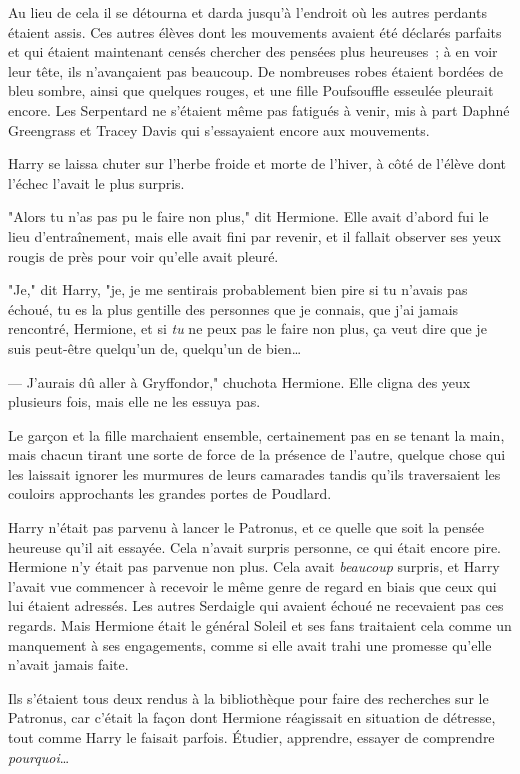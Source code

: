 Au lieu de cela il se détourna et darda jusqu'à l'endroit où les autres perdants étaient assis. Ces autres élèves dont les mouvements avaient été déclarés parfaits et qui étaient maintenant censés chercher des pensées plus heureuses~; à en voir leur tête, ils n'avançaient pas beaucoup. De nombreuses robes étaient bordées de bleu sombre, ainsi que quelques rouges, et une fille Poufsouffle esseulée pleurait encore. Les Serpentard ne s'étaient même pas fatigués à venir, mis à part Daphné Greengrass et Tracey Davis qui s'essayaient encore aux mouvements.

Harry se laissa chuter sur l'herbe froide et morte de l'hiver, à côté de l'élève dont l'échec l'avait le plus surpris.

"Alors tu n'as pas pu le faire non plus," dit Hermione. Elle avait d'abord fui le lieu d'entraînement, mais elle avait fini par revenir, et il fallait observer ses yeux rougis de près pour voir qu'elle avait pleuré.

"Je," dit Harry, "je, je me sentirais probablement bien pire si tu n'avais pas échoué, tu es la plus gentille des personnes que je connais, que j'ai jamais rencontré, Hermione, et si \emph{tu} ne peux pas le faire non plus, ça veut dire que je suis peut-être quelqu'un de, quelqu'un de bien…

--- J'aurais dû aller à Gryffondor," chuchota Hermione. Elle cligna des yeux plusieurs fois, mais elle ne les essuya pas.

\later

Le garçon et la fille marchaient ensemble, certainement pas en se tenant la main, mais chacun tirant une sorte de force de la présence de l'autre, quelque chose qui les laissait ignorer les murmures de leurs camarades tandis qu'ils traversaient les couloirs approchants les grandes portes de Poudlard.

Harry n'était pas parvenu à lancer le Patronus, et ce quelle que soit la pensée heureuse qu'il ait essayée. Cela n'avait surpris personne, ce qui était encore pire. Hermione n'y était pas parvenue non plus. Cela avait \emph{beaucoup} surpris, et Harry l'avait vue commencer à recevoir le même genre de regard en biais que ceux qui lui étaient adressés. Les autres Serdaigle qui avaient échoué ne recevaient pas ces regards. Mais Hermione était le général Soleil et ses fans traitaient cela comme un manquement à ses engagements, comme si elle avait trahi une promesse qu'elle n'avait jamais faite.

Ils s'étaient tous deux rendus à la bibliothèque pour faire des recherches sur le Patronus, car c'était la façon dont Hermione réagissait en situation de détresse, tout comme Harry le faisait parfois. Étudier, apprendre, essayer de comprendre \emph{pourquoi}…

